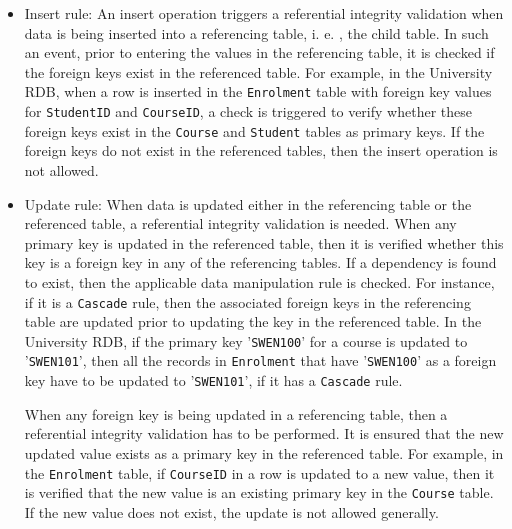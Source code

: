 	\begin{itemize}
		\item Insert rule: An insert operation triggers a referential integrity
		validation when data is being inserted into a referencing table,   i. e. ,   the
		child table.  In such an event,   prior to entering the values in the
		referencing table,   it is checked if the foreign keys exist in the referenced
		table.  For example,   in the University \ac{RDB},   when a row is inserted in
		the \texttt{Enrolment} table with foreign key values for \texttt{StudentID} and
		\texttt{CourseID},   a check is triggered to verify whether these foreign keys
		exist in the \texttt{Course} and \texttt{Student} tables as primary keys.  If
		the foreign keys do not exist in the referenced tables,   then the insert
		operation is not allowed.
		
		\item Update rule: When data is updated either in the referencing table or the
		referenced table,   a referential integrity validation is needed.  When any
		primary key is updated in the referenced table, then it is verified whether this
		key is a foreign key in any of the referencing tables.  If a dependency is found
		to exist,   then the applicable data manipulation rule is checked.  For
		instance,   if it is a \texttt{Cascade} rule,   then the associated foreign keys
		in the referencing table are updated prior to updating the key in the referenced
		table.  In the University \ac{RDB}, if the primary key '\texttt{SWEN100}' for a
		course is updated to '\texttt{SWEN101}',   then all the records in
		\texttt{Enrolment} that have '\texttt{SWEN100}' as a foreign key have to be
		updated to '\texttt{SWEN101}', if it has a \texttt{Cascade} rule.
		
		When any foreign key is being updated in a referencing table,   then a
		referential integrity validation has to be performed.  It is ensured that the
		new updated value exists as a primary key in the referenced table.  For example,
		  in the \texttt{Enrolment} table,   if \texttt{CourseID} in a row is updated to
		a new value,   then it is verified that the new value is an existing primary key
		in the \texttt{Course} table.  If the new value does not exist,   the update is
		not allowed generally.
		

\end{itemize}
